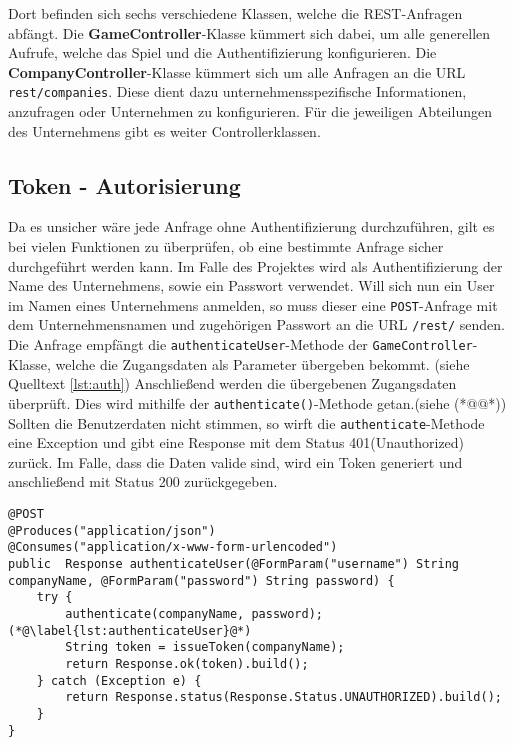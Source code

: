 Dort befinden sich sechs verschiedene Klassen, welche die \ac{REST}-Anfragen abfängt. Die \textbf{GameController}-Klasse kümmert sich dabei, um alle generellen Aufrufe, welche das Spiel und die Authentifizierung konfigurieren.
Die \textbf{CompanyController}-Klasse kümmert sich um alle Anfragen an die URL \texttt{rest/companies}. Diese dient dazu unternehmensspezifische Informationen, anzufragen oder Unternehmen zu konfigurieren. Für die jeweiligen Abteilungen des Unternehmens gibt es weiter Controllerklassen. 


\subsection{Token - Autorisierung}

Da es unsicher wäre jede Anfrage ohne Authentifizierung durchzuführen, gilt es bei vielen Funktionen zu überprüfen, ob eine bestimmte Anfrage sicher durchgeführt werden kann.
Im Falle des Projektes wird als Authentifizierung der Name des Unternehmens, sowie ein Passwort verwendet. Will sich nun ein User im Namen eines Unternehmens anmelden, so muss dieser eine \texttt{POST}-Anfrage mit dem Unternehmensnamen und zugehörigen Passwort an die URL \texttt{/rest/} senden. 
Die Anfrage empfängt die \texttt{authenticateUser}-Methode der \texttt{GameController}-Klasse, welche die Zugangsdaten als Parameter übergeben bekommt. (siehe Quelltext \ref{lst:auth}) 
Anschließend werden die übergebenen Zugangsdaten überprüft. Dies wird mithilfe der \texttt{authenticate()}-Methode getan.(siehe (*@\label{lst:authenticateUser}@*))
Sollten die Benutzerdaten nicht stimmen, so wirft die \texttt{authenticate}-Methode eine Exception und gibt eine Response mit dem Status 401(Unauthorized) zurück. Im Falle, dass die Daten valide sind, wird ein Token generiert und anschließend mit Status 200 zurückgegeben.

\lstset{language=JAVA}
\begin{lstlisting}[float=htbp, caption={\texttt{authentivateUser() Methode der \texttt{GameController}-Klasse} }, label={lst:auth}]
@POST
@Produces("application/json")
@Consumes("application/x-www-form-urlencoded")
public  Response authenticateUser(@FormParam("username") String companyName, @FormParam("password") String password) {
	try {
		authenticate(companyName, password);  (*@\label{lst:authenticateUser}@*)
		String token = issueToken(companyName);
		return Response.ok(token).build();
	} catch (Exception e) {
		return Response.status(Response.Status.UNAUTHORIZED).build();
	}
}
\end{lstlisting}

